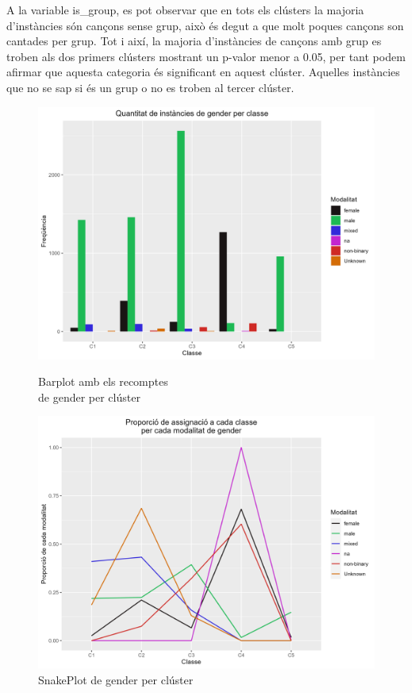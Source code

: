 A la variable is\_group, es pot observar que en tots els clústers la majoria d'instàncies són cançons sense grup, això és degut a que molt poques cançons son cantades per grup. Tot i així, la majoria d'instàncies de cançons amb grup es troben als dos primers clústers mostrant un p-valor menor a 0.05, per tant podem afirmar que aquesta categoria és significant en aquest clúster. Aquelles instàncies que no se sap si és un grup o no es troben al tercer clúster.

\begin{figure}[H]
\centering
    \begin{minipage}{.49\textwidth}
        \centering
        \includegraphics[width=0.95\linewidth]{Images/5_Profiling/categoriques/cat/Cat_BarPlot_gender.png}
        \caption{Barplot amb els recomptes \\ de gender per clúster}
        \label{fig:Cat_BarPlot_gender}
    \end{minipage}%
    \begin{minipage}{.49\textwidth}
        \centering
        \includegraphics[width=0.95\linewidth]{Images/5_Profiling/categoriques/cat/Cat_SnakePlot_gender.png}
        \caption{SnakePlot de gender per clúster}
        \label{fig:Cat_SnakePlot_gender}
    \end{minipage}%
\end{figure}

